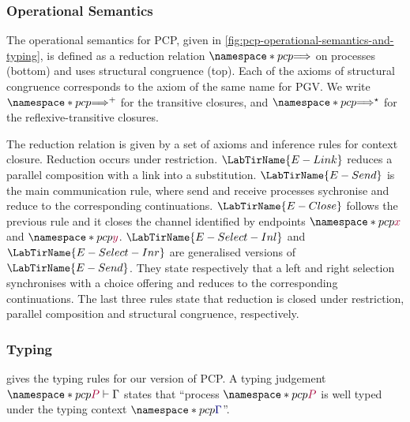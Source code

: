 

\subsubsection*{Operational Semantics}
The operational semantics for PCP, given in \cref{fig:pcp-operational-semantics-and-typing}, is defined as a reduction relation $\pcp{\red}$ on processes (bottom) and uses structural congruence (top). Each of the axioms of structural congruence corresponds to the axiom of the same name for PGV. We write $\pcp{\red^+}$ for the transitive closures, and $\pcp{\red^\star}$ for the reflexive-transitive closures.

The reduction relation is given by a set of axioms and inference rules for context closure. Reduction occurs under restriction. $\LabTirName{E-Link}$ reduces a parallel composition with a link into a substitution. $\LabTirName{E-Send}$ is the main communication rule, where send and receive processes sychronise and reduce to the corresponding continuations. $\LabTirName{E-Close}$ follows the previous rule and it closes the channel identified by endpoints $\pcp{\tm{x}}$ and $\pcp{\tm{y}}$. $\LabTirName{E-Select-Inl}$ and $\LabTirName{E-Select-Inr}$ are generalised versions of $\LabTirName{E-Send}$. They state respectively that a left and right selection synchronises with a choice offering and reduces to the corresponding continuations. The last three rules state that reduction is closed under restriction, parallel composition and structural congruence, respectively. 

\subsubsection*{Typing}
 gives the typing rules for our version of PCP. A typing judgement $\pcp{\seq{P}{\Gamma}}$ states that ``process $\pcp{\tm{P}}$ is well typed under the typing context $\pcp{\ty{\Gamma}}$''.

